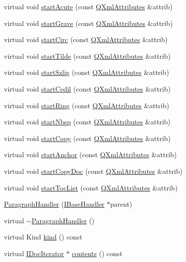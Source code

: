 \begin{DoxyCompactItemize}
\item 
virtual void \hyperlink{class_paragraph_handler_aa8715e6f35fc96e59ebc619d346133cf}{start\+Acute} (const \hyperlink{class_q_xml_attributes}{Q\+Xml\+Attributes} \&attrib)
\item 
virtual void \hyperlink{class_paragraph_handler_a3fc2750784c711133735026b2058c95c}{start\+Grave} (const \hyperlink{class_q_xml_attributes}{Q\+Xml\+Attributes} \&attrib)
\item 
virtual void \hyperlink{class_paragraph_handler_a53a2200166a2aae736db5e2f3378f1d2}{start\+Circ} (const \hyperlink{class_q_xml_attributes}{Q\+Xml\+Attributes} \&attrib)
\item 
virtual void \hyperlink{class_paragraph_handler_a7f12f315a8576b6e69639307c0ce32a1}{start\+Tilde} (const \hyperlink{class_q_xml_attributes}{Q\+Xml\+Attributes} \&attrib)
\item 
virtual void \hyperlink{class_paragraph_handler_a09095521767d2c7cc6adc4f31a423466}{start\+Szlig} (const \hyperlink{class_q_xml_attributes}{Q\+Xml\+Attributes} \&attrib)
\item 
virtual void \hyperlink{class_paragraph_handler_a1107f7b287d79ed67b7674687f165e71}{start\+Cedil} (const \hyperlink{class_q_xml_attributes}{Q\+Xml\+Attributes} \&attrib)
\item 
virtual void \hyperlink{class_paragraph_handler_afc743b16ad7fa21b9a1f984d170b082a}{start\+Ring} (const \hyperlink{class_q_xml_attributes}{Q\+Xml\+Attributes} \&attrib)
\item 
virtual void \hyperlink{class_paragraph_handler_a8d86ca2d9e47775c78b6da304138b23c}{start\+Nbsp} (const \hyperlink{class_q_xml_attributes}{Q\+Xml\+Attributes} \&attrib)
\item 
virtual void \hyperlink{class_paragraph_handler_a7bb452cdaf8277ca5407dbb8f72b6349}{start\+Copy} (const \hyperlink{class_q_xml_attributes}{Q\+Xml\+Attributes} \&attrib)
\item 
virtual void \hyperlink{class_paragraph_handler_a6de0dd9858f13183a8b2d871be49495a}{start\+Anchor} (const \hyperlink{class_q_xml_attributes}{Q\+Xml\+Attributes} \&attrib)
\item 
virtual void \hyperlink{class_paragraph_handler_a907673c2ce5ad7515f8813b7f6a000ef}{start\+Copy\+Doc} (const \hyperlink{class_q_xml_attributes}{Q\+Xml\+Attributes} \&attrib)
\item 
virtual void \hyperlink{class_paragraph_handler_ae531bc17befad4534ff0ceb15111b72a}{start\+Toc\+List} (const \hyperlink{class_q_xml_attributes}{Q\+Xml\+Attributes} \&attrib)
\item 
\hyperlink{class_paragraph_handler_a9233054818146db22bbd3f6653693575}{Paragraph\+Handler} (\hyperlink{class_i_base_handler}{I\+Base\+Handler} $\ast$parent)
\item 
virtual \hyperlink{class_paragraph_handler_a5e4436ea90a3ed098a4faf35523e4e8e}{$\sim$\+Paragraph\+Handler} ()
\item 
virtual Kind \hyperlink{class_paragraph_handler_ab295c027985eb176ba2ae08a75afac8d}{kind} () const 
\item 
virtual \hyperlink{class_i_doc_iterator}{I\+Doc\+Iterator} $\ast$ \hyperlink{class_paragraph_handler_a24cbe4c6117ea1d4fa962d7941b5e8e2}{contents} () const 
\end{DoxyCompactItemize}
